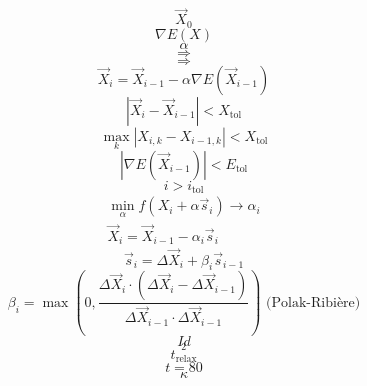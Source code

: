 \documentclass{scrreprt}
\begin{document}
\begin{equation}
\vec X_0
\end{equation}
\begin{equation}
\nabla E(X)
\end{equation}
\begin{equation}
\alpha
\end{equation}
\begin{equation}
\Rightarrow
\end{equation}
\begin{equation}
\Rightarrow
\end{equation}
\begin{equation}
  \vec X_i = \vec X_{i-1} - \alpha \nabla E(\vec X_{i-1})
\end{equation}
\begin{equation}
|\vec X_i - \vec X_{i-1}| < X_\text{tol}
\end{equation}
\begin{equation}
\max_k{|X_{i,k} - X_{i-1,k}|} < X_\text{tol}
\end{equation}
\begin{equation}
|\nabla E(\vec X_{i-1})| < E_\text{tol}
\end{equation}
\begin{equation}
i > i_\text{tol}
\end{equation}
\begin{gather}
  \min_\alpha f(X_i+\alpha \vec s_i) \rightarrow \alpha_i \\
  \vec X_i = \vec X_{i-1} - \alpha_i \vec s_i
\end{gather}
\begin{equation}
  \vec s_i = \Delta \vec X_i + \beta_i \vec s_{i-1}
\end{equation}
\begin{equation}
  \beta_i = \max \left(0, \frac{\Delta \vec X_i \cdot \left(\Delta \vec X_i - \Delta \vec X_{i-1}\right)}{\Delta \vec X_{i-1} \cdot \Delta \vec X_{i-1}}\right) \text{~(Polak-Ribière)}
\end{equation}
\begin{equation}
Id
\end{equation}
\begin{equation}
_2
\end{equation}
\begin{equation}
t_\text{relax}
\end{equation}
\begin{equation}
\end{equation}
\begin{equation}
t=80
\end{equation}
\begin{equation}
\kappa
\end{equation}
\end{document}
